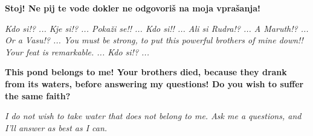 \textbf{ Stoj! Ne pij te vode dokler ne odgovoriš na moja vprašanja! }\medskip 

\textit{ Kdo si!? ... Kje si!? ... Pokaži se!! ... Kdo si!! ... Ali si Rudra!? ... A Maruth!? ... Or a Vasu!? ... You must be strong, to put this powerful brothers of mine down!! Your feat is remarkable. ... Kdo si!? ... }\medskip 

\textbf{ This pond belongs to me! Your brothers died, because they drank from its waters, before answering my questions! Do you wish to suffer the same faith? }\medskip 

\textit{ I do not wish to take water that does not belong to me. Ask me a questions, and I'll answer as best as I can. } 